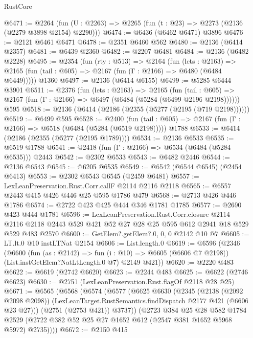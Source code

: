 \begin{lexlean}{RustCore}
\begin{coremodule}
@6471 := @2264 (fun (U : @2263) => @2265 (fun (t : @23) => @2273 (@2136 (@2279 @3898 @2154) @2290)))
@6474 := @6436 (@6462 @6471) @3896
@6476 := @2121 @6461 @6471
@6478 := @2351 @6460 @562
@6480 := @2136 (@6414 @2357)
@6481 := @6439 @2360
@6482 := @2207 @6481
@6484 := @2136 (@6482 @2228)
@6495 := @2354
    (fun (rty : @513) =>
    @2164
      (fun (lets : @2163) =>
      @2165 (fun (tail : @605) => @2167 (fun (Γ : @2166) => @6480 (@6484 @6449)))))
    @1360
@6497 := @2136 (@6414 @6155)
@6499 := @5285 @6444 @3901
@6511 := @2376
    (fun (lets : @2163) =>
    @2165
      (fun (tail : @605) => @2167 (fun (Γ : @2166) => @6497 (@6484 (@5284 (@6499 @2196 @2198))))))
    @595
@6518 := @2136 (@6414 (@2186 (@2355 (@5277 (@2195 (@719 @2198))))))
@6519 := @6499 @595
@6528 := @2400
    (fun (tail : @605) => @2167 (fun (Γ : @2166) => @6518 (@6484 (@5284 (@6519 @2198)))))
    @1788
@6533 := @6414 (@2186 (@2355 (@5277 (@2195 @1789))))
@6534 := @2136 @6533
@6535 := @6519 @1788
@6541 := @2418 (fun (Γ : @2166) => @6534 (@6484 (@5284 @6535))) @2443
@6542 := @2302 @6533
@6543 := @6482 @2446
@6544 := @2136 @6543
@6545 := @6205 @6535
@6549 := @6542 (@6544 @6545) (@2454 @6413)
@6553 := @2302 @6543 @6545 (@2459 @6481)
@6557 := LexLeanPreservation.Rust.Corr.callF @2114 @2116 @2118
@6565 := @6557 @2443 @415 @426 @446 @25 @595 @1786 @479
@6568 := @2713 @426 @446 @1786
@6574 := @2722 @423 @425 @444 @346 @1781 @1785
@6577 := @2690 @423 @444 @1781
@6596 := LexLeanPreservation.Rust.Corr.closure
    @2114
    @2116
    @2118
    @2443
    @529
    @421
    @52
    @27
    @28
    @25
    @595
    @612
    @2941
    @18
    @529
    @529
    @483
    @2570
@6600 := GetElem?.getElem?.{0, 0, 0} @2142 @10 @7
@6605 := LT.lt.{0} @10 instLTNat @2154
@6606 := List.length.{0}
@6619 := @6596
    (@2346
      (@6600
        (fun (as : @2142) => fun (i : @10) => @6605 (@6606 @7 @2198))
        (List.instGetElem?NatLtLength.{0} @7)
        @2149
        @421))
@6620 := @2220 @483
@6622 := @6619 (@2742 @6620)
@6623 := @2244 @483
@6625 := @6622 (@2746 @6623)
@6630 := @2751 (LexLeanPreservation.Rust.flagOf @2118 @28 @25)
@6671 := @6565
    (@6568
      (@6574
        (@6577
          (@6625
            @6630
            (@2345
              (@2138 (@2092 @2098 @2098))
              (LexLeanTarget.RustSemantics.findDispatch @2177 @421 (@6606 @23 @27)))
            (@2751 (@2753 @421))
            @3737))
        (@2723
          @384
          @25
          @28
          @582
          @1784
          @2529
          (@2722 @382 @52 @25 @27 @1652 @612 (@2547 @381 @1652 @5968 @5972) @2735))))
@6672 := @2150 @415

\end{coremodule}
\end{lexlean}
